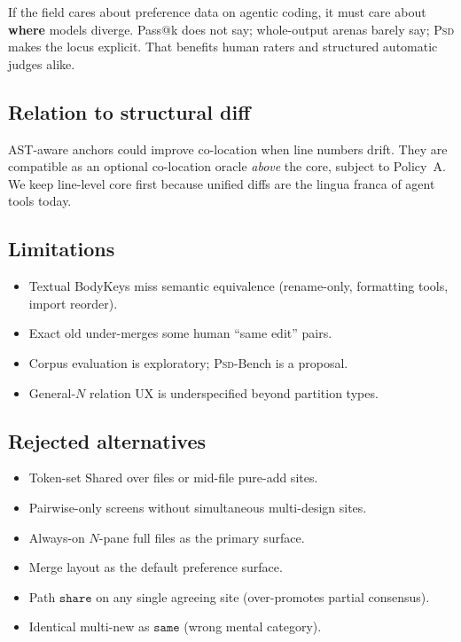 \documentclass[
  11pt,
  a4paper,
  oneside,
  numbers=noenddot,
  abstract=true,
  headings=normal,
  DIV=11,
  BCOR=0mm,
]{scrartcl}
\theoremstyle{definition}
\theoremstyle{plain}
\theoremstyle{remark}
\newcommand{\PSD}{\textsc{Psd}}
\newcommand{\badge}[1]{\texttt{#1}}
\begin{document}
If the field cares about preference data on agentic coding, it must care
about \textbf{where} models diverge. Pass@k does not say; whole-output
arenas barely say; \PSD{} makes the locus explicit. That benefits human
raters and structured automatic judges alike.

\subsection{Relation to structural diff}

AST-aware anchors could improve co-location when line numbers drift.
They are compatible as an optional co-location oracle \emph{above} the
core, subject to Policy~A. We keep line-level core first because unified
diffs are the lingua franca of agent tools today.

\subsection{Limitations}

\begin{itemize}
  \item Textual BodyKeys miss semantic equivalence (rename-only, formatting
        tools, import reorder).
  \item Exact $\mathrm{old}$ under-merges some human ``same edit'' pairs.
  \item Corpus evaluation is exploratory; \PSD{}-Bench is a proposal.
  \item General-$N$ relation UX is underspecified beyond partition types.
\end{itemize}

\subsection{Rejected alternatives}

\begin{itemize}
  \item Token-set Shared over files or mid-file pure-add sites.
  \item Pairwise-only screens without simultaneous multi-design sites.
  \item Always-on $N$-pane full files as the primary surface.
  \item Merge layout as the default preference surface.
  \item Path $\badge{share}$ on any single agreeing site (over-promotes
        partial consensus).
  \item Identical multi-new as $\badge{same}$ (wrong mental category).
\end{itemize}
\end{document}
